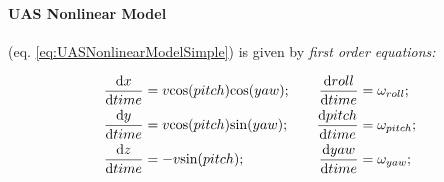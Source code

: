 \paragraph{UAS Nonlinear Model} (eq. \ref{eq:UASNonlinearModelSimple}) is given by \emph{first order equations:}

\begin{equation}\label{eq:UASNonlinearModelSimple}
    \begin{aligned}
        \frac{\text{d} x}{\text{d} time} &= v\cos(pitch)\cos(yaw);\\
        \frac{\text{d} y}{\text{d} time} &= v\cos(pitch)\sin(yaw);\\
        \frac{\text{d} z}{\text{d} time} &= -v\sin(pitch);\\
    \end{aligned}\\\quad\quad
    \begin{aligned}
        \frac{\text{d} roll}{\text{d} time} &= \omega_{roll};\\
        \frac{\text{d} pitch}{\text{d} time} &= \omega_{pitch};\\
        \frac{\text{d} yaw}{\text{d} time} &= \omega_{yaw};\\
    \end{aligned}
\end{equation}

